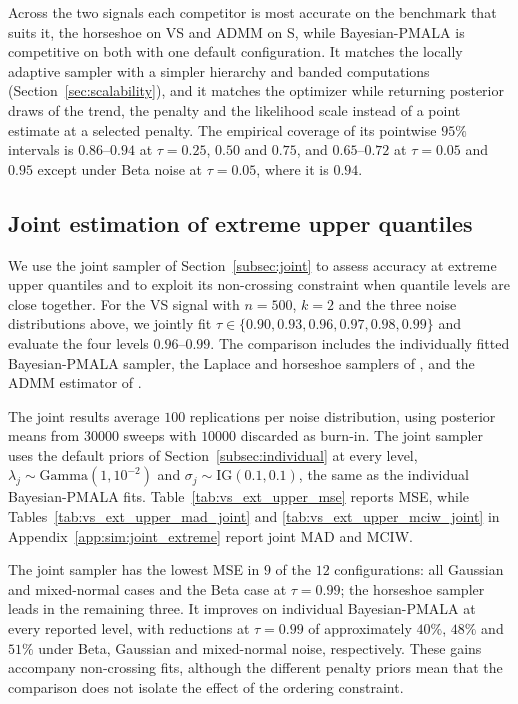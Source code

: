 Across the two signals each competitor is most accurate on the benchmark that suits it, the horseshoe on VS and ADMM on S, while Bayesian-PMALA is competitive on both with one default configuration. It matches the locally adaptive sampler with a simpler hierarchy and banded computations (Section~\ref{sec:scalability}), and it matches the optimizer while returning posterior draws of the trend, the penalty and the likelihood scale instead of a point estimate at a selected penalty. The empirical coverage of its pointwise $95\%$ intervals is $0.86$--$0.94$ at $\tau=0.25$, $0.50$ and $0.75$, and $0.65$--$0.72$ at $\tau=0.05$ and $0.95$ except under Beta noise at $\tau=0.05$, where it is $0.94$.

\subsection{Joint estimation of extreme upper quantiles}
\label{sec:sim:extreme}

We use the joint sampler of Section~\ref{subsec:joint} to assess accuracy at extreme upper quantiles and to exploit its non-crossing constraint when quantile levels are close together. For the VS signal with $n=500$, $k=2$ and the three noise distributions above, we jointly fit $\tau\in\{0.90,0.93,0.96,0.97,0.98,0.99\}$ and evaluate the four levels $0.96$--$0.99$. The comparison includes the individually fitted Bayesian-PMALA sampler, the Laplace and horseshoe samplers of \citet{onizuka2024fast}, and the ADMM estimator of \citet{brantley2020baseline}.

The joint results average $100$ replications per noise distribution, using posterior means from $30000$ sweeps with $10000$ discarded as burn-in. The joint sampler uses the default priors of Section~\ref{subsec:individual} at every level, $\lambda_j\sim\mathrm{Gamma}(1,10^{-2})$ and $\sigma_j\sim\mathrm{IG}(0.1,0.1)$, the same as the individual Bayesian-PMALA fits. Table~\ref{tab:vs_ext_upper_mse} reports MSE, while Tables~\ref{tab:vs_ext_upper_mad_joint} and \ref{tab:vs_ext_upper_mciw_joint} in Appendix~\ref{app:sim:joint_extreme} report joint MAD and MCIW.

The joint sampler has the lowest MSE in $9$ of the $12$ configurations: all Gaussian and mixed-normal cases and the Beta case at $\tau=0.99$; the horseshoe sampler leads in the remaining three. It improves on individual Bayesian-PMALA at every reported level, with reductions at $\tau=0.99$ of approximately $40\%$, $48\%$ and $51\%$ under Beta, Gaussian and mixed-normal noise, respectively. These gains accompany non-crossing fits, although the different penalty priors mean that the comparison does not isolate the effect of the ordering constraint.

